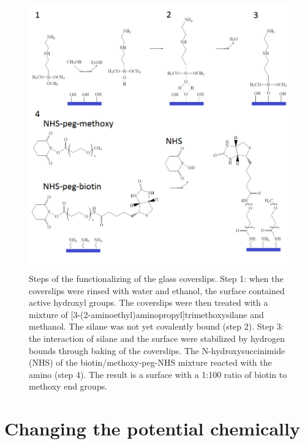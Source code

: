 \documentclass[twoside,single]{lion-msc}
\begin{document}
\begin{figure}[ht!]
\centering
\includegraphics[width=\textwidth]{passivation.PNG}
\caption{Steps of the functionalizing of the glass coverslips. Step 1: when the coverslips were rinsed with water and ethanol, the surface contained active hydroxyl groups. The coverslips were then treated with a mixture of [3-(2-aminoethyl)aminopropyl]trimethoxysilane and methanol. The silane was not yet covalently bound (step 2). Step 3: the interaction of silane and the surface were stabilized by hydrogen bounds through baking of the coverslips. The N-hydroxysuccinimide (NHS) of the biotin/methoxy-peg-NHS mixture reacted with the amino (step 4). The result is a surface with a 1:100 ratio of biotin to methoxy end groups.}
\label{func}
\end{figure}


\section{Changing the potential chemically}\label{pot_chem}
\end{document}
